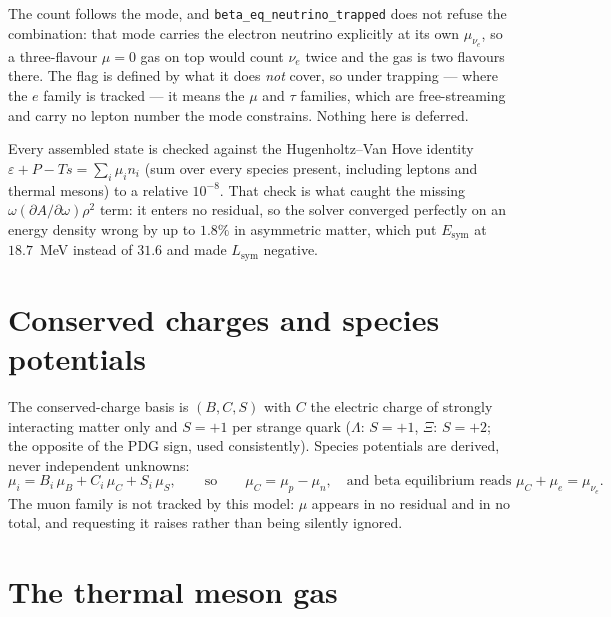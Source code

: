 \documentclass[aps,prc,onecolumn,superscriptaddress,nofootinbib,10pt]{revtex4-2}
\newcommand{\muB}{\mu_B}
\newcommand{\muC}{\mu_C}
\newcommand{\muS}{\mu_S}
\newcommand{\munue}{\mu_{\nu_e}}
\begin{document}
The count follows the mode, and \texttt{beta\_eq\_neutrino\_trapped} does not
refuse the combination: that mode carries the electron neutrino explicitly at
its own $\munue$, so a three-flavour $\mu = 0$ gas on top would count $\nu_e$
twice and the gas is two flavours there. The flag is defined by what it does
\emph{not} cover, so under trapping --- where the $e$ family is tracked --- it
means the $\mu$ and $\tau$ families, which are free-streaming and carry no
lepton number the mode constrains. Nothing here is deferred.

Every assembled state is checked against the Hugenholtz--Van Hove
identity~\cite{HugenholtzVanHove1958}
$\varepsilon + P - T s = \sum_i \mu_i n_i$ (sum over every species present,
including leptons and thermal mesons) to a relative $10^{-8}$. That check is
what caught the missing $\omega(\partial A/\partial\omega)\rho^2$ term: it
enters no residual, so the solver converged perfectly on an energy density
wrong by up to $1.8\%$ in asymmetric matter, which put $E_{\mathrm{sym}}$ at
$18.7$~MeV instead of $31.6$ and made $L_{\mathrm{sym}}$ negative.

\section{Conserved charges and species potentials}

The conserved-charge basis is $(B, C, S)$ with $C$ the electric charge of
strongly interacting matter only and $S = +1$ per strange quark ($\Lambda$:
$S=+1$, $\Xi$: $S=+2$; the opposite of the PDG sign, used consistently).
Species potentials are derived, never independent unknowns:
%
\begin{equation}
\mu_i = B_i\, \muB + C_i\, \muC + S_i\, \muS ,
\qquad\text{so}\qquad
\muC = \mu_p - \mu_n,
\quad \text{and beta equilibrium reads } \muC + \mu_e = \munue .
\label{eq:basis}
\end{equation}
%
The muon family is not tracked by this model: $\mu$ appears in no residual and
in no total, and requesting it raises rather than being silently ignored.

\section{The thermal meson gas}
\label{sec:gas}
\end{document}
